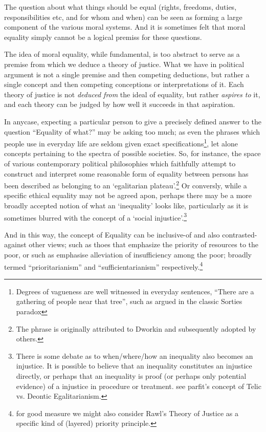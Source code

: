 The question about what things should be equal (rights, freedoms, duties, responsibilities etc, and for whom and when) can be seen as forming a large component of the various moral systems. And it is sometimes felt that moral equality simply cannot be a logical premiss for these questions.

\begin{displayquote}
The idea of moral equality, while fundamental, is too abstract to serve as a premise from which we deduce a theory of justice. What we have in political argument is not a single premise and then competing deductions, but rather a single concept and then competing conceptions or interpretations of it. Each theory of justice is not \textit{deduced from} the ideal of equality, but rather \textit{aspires to} it, and each theory can be judged by how well it succeeds in that aspiration.\cite{kymlicka2002contemporary}
\end{displayquote}

In anycase, expecting a particular person to give a precisely defined answer to the question ``Equality of what?'' may be asking too much; as even the phrases which people use in everyday life are seldom given exact specifications\footnote{Degrees of vagueness are well witnessed in everyday sentences, ``There are a gathering of people near that tree'', such as argued in the classic Sorties paradox\cite{frances_2018}}, let alone concepts pertaining to the spectra of possible societies.
So, for instance, the space of various contemporary political philosophies which faithfully attempt to construct and interpret some reasonable form of equality between persons has been described as belonging to an `egalitarian plateau'.\footnote{The phrase is originally attributed to Dworkin and subsequently adopted by others.}\cite{Brown2007}
Or conversly, while a specific ethical equality may not be agreed apon, perhaps there may be a more broadly accepted notion of what an `inequality' looks like,
particularly as it is sometimes blurred with the concept of a `social injustice'.\footnote{There is some debate as to when/where/how an inequality also becomes an injustice. It is possible to believe that an inequality constitutes an injustice directly, or perhaps that an inequality is proof (or perhaps only potential evidence) of a injustice in procedure or treatment. see parfit's concept of Telic vs. Deontic Egalitarianism.\cite{equalityandpriorityparfit}}

And in this way, the concept of Equality can be inclusive-of and also contrasted-against other views; such as thoes that emphasize the priority of resources to the poor, or such as emphasise alleviation of insufficiency among the poor; broadly termed ``prioritarianism'' and ``sufficientarianism'' respectively.\cite{sep-egalitarianism}\footnote{for good measure we might also consider Rawl's Theory of Justice \cite{rawls2005theory} as a specific kind of (layered) priority principle.}

